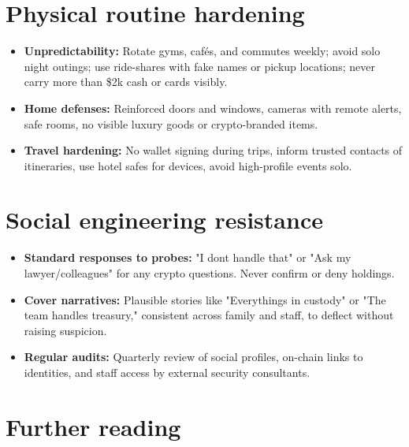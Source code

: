 \section{Physical routine hardening}\label{physical-routine-hardening}

\begin{itemize}
\tightlist
\item
  \textbf{Unpredictability:} Rotate gyms, cafés, and commutes weekly; avoid solo night outings; use ride-shares with fake names or pickup locations; never carry more than \$2k cash or cards visibly.
\item
  \textbf{Home defenses:} Reinforced doors and windows, cameras with remote alerts, safe rooms, no visible luxury goods or crypto-branded items.
\item
  \textbf{Travel hardening:} No wallet signing during trips, inform trusted contacts of itineraries, use hotel safes for devices, avoid high-profile events solo.
\end{itemize}

\section{Social engineering resistance}\label{social-engineering-resistance}

\begin{itemize}
\tightlist
\item
  \textbf{Standard responses to probes:} "I don\textquotesingle t handle that" or "Ask my lawyer/colleagues" for any crypto questions. Never confirm or deny holdings.
\item
  \textbf{Cover narratives:} Plausible stories like "Everything\textquotesingle s in custody" or "The team handles treasury," consistent across family and staff, to deflect without raising suspicion.
\item
  \textbf{Regular audits:} Quarterly review of social profiles, on-chain links to identities, and staff access by external security consultants.
\end{itemize}

\section{Further reading}\label{further-reading-4}

